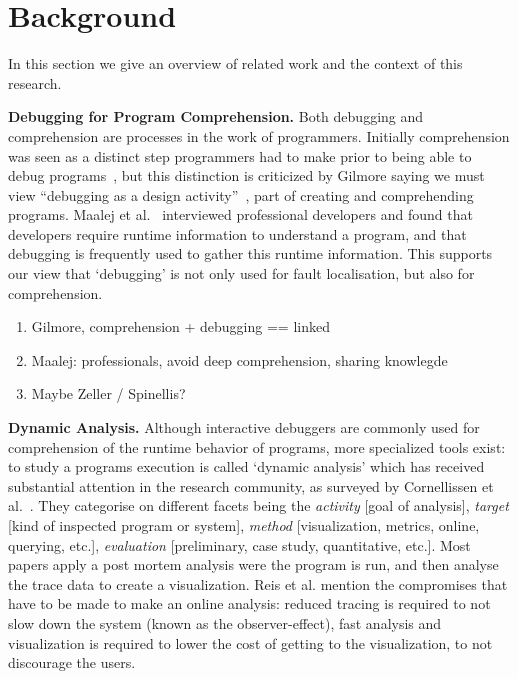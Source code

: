 \section{Background}
In this section we give an overview of related work 
and the context of this research.

\textbf{Debugging for Program Comprehension.}
Both debugging and comprehension are processes in the work of programmers.
Initially comprehension was seen as a distinct step programmers had to make
prior to being able to debug programs~\cite{katz1987debugging}, 
but this distinction is criticized by Gilmore saying we must view 
``debugging as a design activity''~\cite{gilmore1991models}, 
part of creating and comprehending programs. 
Maalej et al.~\cite{Maalej2014} interviewed professional developers 
and found that developers require runtime information to understand a program,
and that debugging is frequently used to gather this runtime information.
This supports our view that `debugging' is not only used for fault localisation,
but also for comprehension.
{\color{red}
\begin{enumerate}
 \item Gilmore, comprehension + debugging == linked
 \item Maalej: professionals, avoid deep comprehension, sharing knowlegde
 \item Maybe Zeller / Spinellis?
\end{enumerate}
}

\textbf{Dynamic Analysis.}
Although interactive debuggers are commonly used for comprehension 
of the runtime behavior of programs, more specialized tools exist: 
to study a programs execution is called `dynamic analysis' which has 
received substantial attention in the research community,
as surveyed by Cornellissen et al.~\cite{cornelissen2009systematic}.
They categorise on different facets being the 
\textit{activity} [goal of analysis],
\textit{target} [kind of inspected program or system],
\textit{method} [visualization, metrics, online, querying, etc.],
\textit{evaluation} [preliminary, case study, quantitative, etc.].
Most papers apply a post mortem analysis were the program is run,
and then analyse the trace data to create a visualization. 
Reis et al. mention the compromises
that have to be made to make an online analysis: 
reduced tracing is required to not slow down the 
system (known as the observer-effect), fast analysis 
and visualization is required to lower the cost of getting 
to the visualization, to not discourage the users.

